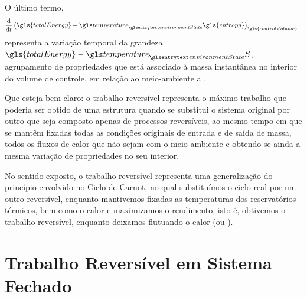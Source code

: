     O último termo,
    \begin{equation} \label{eq:4.11}
        \DDt{}
        \left(
            \gls{totalEnergy}
            -
            \gsub{temperature}{environmentState}
            \gls{entropy}
        \right)_{\gls{controlVolume}}\,,
    \end{equation}
    representa a variação temporal da grandeza
    $\gls{totalEnergy}-\gsub{temperature}{environmentState}S$, agrupamento de
    propriedades que está associado à massa instantânea no interior do volume
    de controle, em relação ao meio-ambiente a
    .

    Que esteja bem claro: o trabalho reversível representa o máximo trabalho
    que poderia ser obtido de uma estrutura quando se substitui o sistema
    original por outro que seja composto apenas de processos reversíveis, ao
    mesmo tempo em que se mantêm fixadas todas as condições originais de
    entrada e de saída de massa, todos os fluxos de calor que não sejam com o
    meio-ambiente e obtendo-se ainda a mesma variação de propriedades no seu
    interior.

    No sentido exposto, o trabalho reversível representa uma generalização do
    princípio envolvido no Ciclo de Carnot, no qual substituímos o ciclo real
    por um outro reversível, enquanto mantivemos fixadas as temperaturas dos
    reservatórios térmicos, bem como o calor 
    e maximizamos o rendimento, isto é, obtivemos o trabalho reversível,
    enquanto deixamos flutuando o calor  (ou
    ).


    \section{Trabalho Reversível em Sistema Fechado}

